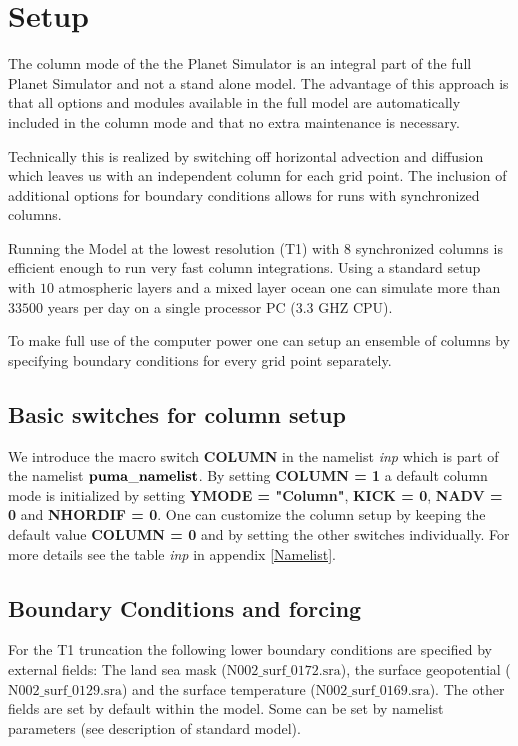 \section{Setup}

The column mode of the the Planet Simulator is an integral part 
of the full Planet Simulator and not a stand alone model. 
The advantage of this approach is that all options and modules 
available in the full model are automatically included in
the column mode and that no extra maintenance is necessary. 

Technically this is realized by switching off horizontal 
advection and diffusion which leaves us with an independent
column for each grid point. The inclusion of additional options
for boundary conditions allows for runs with synchronized columns.   

Running the Model at the lowest resolution (T1) with  $8$ 
synchronized columns is efficient enough to
run very fast column integrations. Using a standard setup
with $10$ atmospheric layers and a mixed layer ocean one 
can simulate more than $33500$ years per day on a single 
processor PC (3.3 GHZ CPU).

To make full use of the computer power one can setup an ensemble of 
columns by specifying boundary conditions for every grid point 
separately.

\subsection{Basic switches for column setup}

We introduce the macro switch {\bf COLUMN} in the namelist {\it inp}
which is part of the namelist $\mathrm{ \bf puma{\_}namelist}$.
By setting {\bf  COLUMN = 1} a default column mode is initialized by
setting {\bf YMODE = "Column"}, {\bf KICK = 0}, {\bf NADV = 0}
and {\bf NHORDIF = 0}. One can customize the column setup by keeping
the default value {\bf  COLUMN = 0} and by setting the other switches
individually. For more details see the table {\it inp}
in appendix \ref{Namelist}.  

\subsection{Boundary Conditions and forcing}

For the T1 truncation the following lower boundary conditions are specified
by external fields: The land sea mask 
($\mathrm{N002\_surf\_0172.sra}$), 
the surface geopotential ($\mathrm{N002\_surf\_0129.sra}$)
and the surface temperature ($\mathrm{N002\_surf\_0169.sra}$).
The other fields are set by default within the model. Some can be
set by namelist parameters (see description of standard model).

